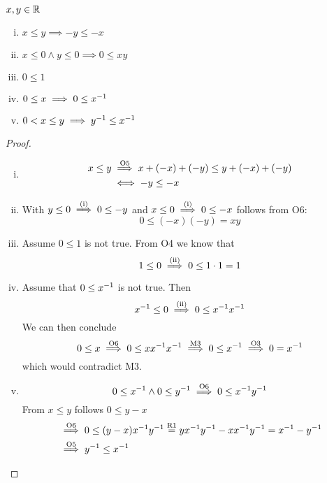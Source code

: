 \documentclass[../../script.tex]{subfiles}
\begin{document}
\begin{thm}
$x, y \in \mathbb{R}$
\begin{enumerate}[(i)]
	\item $x \le y \implies -y \le -x$
	\item $x \le 0 \wedge y \le 0 \implies 0 \le xy$
	\item $0 \le 1$
	\item $0 \le x \implies 0 \le {x}^{-1}$
	\item $0 < x \le y \implies {y}^{-1} \le {x}^{-1}$
\end{enumerate}
\end{thm}
\begin{proof}\leavevmode
\begin{enumerate}[(i)]
	\item 
	\begin{equation}
	\begin{split}
		x \le y &\overset{\text{O5}}{\implies} x + (-x) + (-y) \le y + (-x) + (-y) \\
		&\iff -y \le -x
	\end{split}
	\end{equation}
	
	\item With $y \le 0 \overset{\text{(i)}}{\implies} 0 \le -y$ and $x \le 0 \overset{\text{(i)}}{\implies} 0 \le -x$ follows from O6:
	\begin{equation}
		0 \le (-x)(-y) = xy
	\end{equation}
	
	\item Assume $0 \le 1$ is not true. From O4 we know that
	\begin{equation}
		1 \le 0 \overset{\text{(ii)}}{\implies} 0 \le 1 \cdot 1 = 1
	\end{equation}
	
	\item Assume that $0 \le {x}^{-1}$ is not true. Then 
	\begin{equation}
		{x}^{-1} \le 0 \overset{\text{(ii)}}{\implies} 0 \le {x}^{-1}{x}^{-1}
	\end{equation}
	We can then conclude 
	\begin{equation}
		0 \le x \overset{\text{\text{O6}}}{\implies} 0 \le x{x}^{-1}{x}^{-1} \overset{\text{\text{M3}}}{\implies} 0 \le {x}^{-1} \overset{\text{\text{O3}}}{\implies} 0 = {x}^{-1}
	\end{equation}
	which would contradict M3.

	\item
	\begin{equation}
		0 \le {x}^{-1} \wedge 0 \le {y}^{-1} \overset{\text{O6}}{\implies} 0 \le {x}^{-1}{y}^{-1}
	\end{equation}
	From $x \le y$ follows $0 \le y - x$
	\begin{align}
		&\overset{\text{O6}}{\implies} 0 \le (y - x){x}^{-1}{y}^{-1} \stackrel{\text{R1}}{=} y{x}^{-1}{y}^{-1} - x{x}^{-1}{y}^{-1} = {x}^{-1} - {y}^{-1} \\
		&\overset{\text{O5}}{\implies} {y}^{-1} \le {x}^{-1}
	\end{align}
\end{enumerate}
\end{proof}
\end{document}
